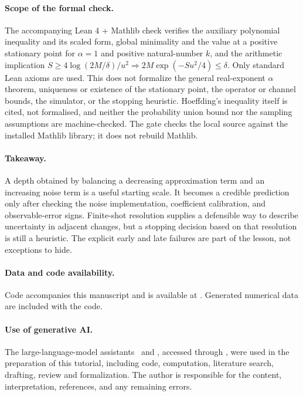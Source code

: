 \documentclass{article}
\begin{document}
\paragraph{Scope of the formal check.}
The accompanying Lean 4 + Mathlib check verifies the auxiliary polynomial inequality
and its scaled form, global minimality and the value at a positive stationary point
for $\alpha=1$ and positive natural-number $k$, and the arithmetic implication
$S\geq4\log(2M/\delta)/u^2\Rightarrow2M\exp(-Su^2/4)\leq\delta$.
Only standard Lean axioms are used. This does not formalize the general real-exponent
$\alpha$ theorem, uniqueness or existence of the stationary point, the operator or
channel bounds, the simulator, or the stopping heuristic. Hoeffding's inequality
itself is cited, not formalised, and neither the probability union bound nor the
sampling assumptions are machine-checked. The gate checks the local source against
the installed Mathlib library; it does not rebuild Mathlib.

\paragraph{Takeaway.}
A depth obtained by balancing a decreasing approximation term and an increasing noise term is a useful starting scale. It becomes a credible prediction only after checking the noise implementation, coefficient calibration, and observable-error signs. Finite-shot resolution supplies a defensible way to describe uncertainty in adjacent changes, but a stopping decision based on that resolution is still a heuristic. The explicit early and late failures are part of the lesson, not exceptions to hide.

\paragraph{Data and code availability.}
Code accompanies this manuscript and is available at
\RepoURL. Generated numerical data are included with the code.

\paragraph{Use of generative AI.}
The large-language-model assistants \AIAstra\ and \AIOpus, accessed through \AIPlatform, were used in the preparation of this tutorial, including code, computation, literature search, drafting, review and formalization. The author is responsible for the content, interpretation, references, and any remaining errors.

\begingroup\small

\endgroup
\end{document}

